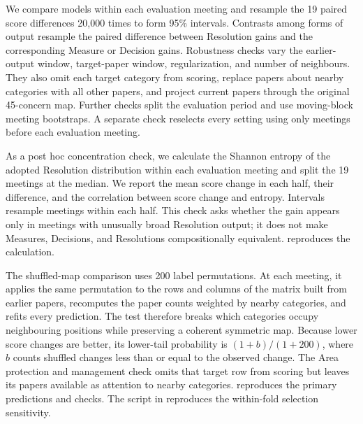 \documentclass{fun_article}
\begin{document}
We compare models within each evaluation meeting and resample the 19 paired score differences 20,000 times to form 95\% intervals. Contrasts among forms of output resample the paired difference between Resolution gains and the corresponding Measure or Decision gains. Robustness checks vary the earlier-output window, target-paper window, regularization, and number of neighbours. They also omit each target category from scoring, replace papers about nearby categories with all other papers, and project current papers through the original 45-concern map. Further checks split the evaluation period and use moving-block meeting bootstraps. A separate check reselects every setting using only meetings before each evaluation meeting.

As a post hoc concentration check, we calculate the Shannon entropy of the adopted Resolution distribution within each evaluation meeting and split the 19 meetings at the median. We report the mean score change in each half, their difference, and the correlation between score change and entropy. Intervals resample meetings within each half. This check asks whether the gain appears only in meetings with unusually broad Resolution output; it does not make Measures, Decisions, and Resolutions compositionally equivalent. \texttt{} reproduces the calculation.

The shuffled-map comparison uses 200 label permutations. At each meeting, it applies the same permutation to the rows and columns of the matrix built from earlier papers, recomputes the paper counts weighted by nearby categories, and refits every prediction. The test therefore breaks which categories occupy neighbouring positions while preserving a coherent symmetric map. Because lower score changes are better, its lower-tail probability is $(1+b)/(1+200)$, where $b$ counts shuffled changes less than or equal to the observed change. The Area protection and management check omits that target row from scoring but leaves its papers available as attention to nearby categories. \texttt{} reproduces the primary predictions and checks. The script in \texttt{} reproduces the within-fold selection sensitivity.
\end{document}
